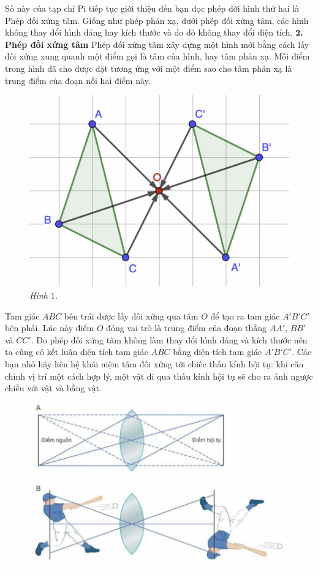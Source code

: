 \begin{multicols}{2}
	Số này của tạp chí Pi tiếp tục giới thiệu đến bạn đọc phép dời hình thứ hai là Phép đối xứng tâm. Giống như phép phản xạ, dưới phép đối xứng tâm, các hình không thay đổi hình dáng hay kích thước và do đó không thay đổi diện tích. 
	\vskip 0.1cm
	\textbf{\color{toancuabi}$\pmb2$. Phép đối xứng tâm}
	\vskip 0.1cm
	Phép đối xứng tâm xây dựng một hình mới bằng cách lấy đối xứng xung quanh một điểm gọi là tâm của hình, hay tâm phản xạ. Mỗi điểm trong hình đã cho được đặt tương ứng với một điểm sao cho tâm phản xạ là trung điểm của đoạn nối hai điểm này.
	\begin{figure}[H]
		\vspace*{-5pt}
		\centering
		\captionsetup{labelformat= empty, justification=centering}
		\includegraphics[width= 0.65\linewidth]{1}
		\caption{\small\textit{\color{toancuabi}Hình $1$.}}
		\vspace*{-10pt}
	\end{figure}
	Tam giác $ABC$ bên trái được lấy đối xứng qua tâm $O$ để tạo ra tam giác $A'B'C'$ bên phải. Lúc này điểm $O$ đóng vai trò là trung điểm của đoạn thẳng $AA'$, $BB'$ và $CC'$. Do phép đối xứng tâm không làm thay đổi hình dáng và kích thước nên ta cũng có kết luận diện tích tam giác $ABC$ bằng diện tích tam giác $A'B'C'$. Các bạn nhỏ hãy liên hệ khái niệm tâm đối xứng tới chiếc thấu kính hội tụ: khi căn chỉnh vị trí một cách hợp lý, một vật đi qua thấu kính hội tụ sẽ cho ra ảnh ngược chiều với vật và bằng vật.
	\begin{figure}[H]
		\vspace*{-5pt}
		\centering
		\captionsetup{labelformat= empty, justification=centering}
		\includegraphics[width= 0.85\linewidth]{2}

\end{figure}
\end{multicols}
